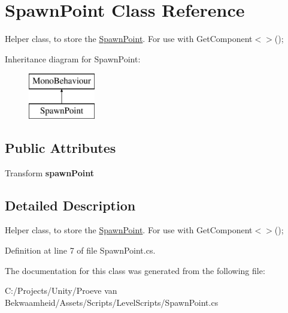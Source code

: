 \hypertarget{class_spawn_point}{\section{Spawn\+Point Class Reference}
\label{class_spawn_point}
}


Helper class, to store the \hyperlink{class_spawn_point}{Spawn\+Point}. For use with Get\+Component$<$$>$();  


Inheritance diagram for Spawn\+Point\+:\begin{figure}[H]
\begin{center}
\leavevmode
\includegraphics[height=2.000000cm]{class_spawn_point}
\end{center}
\end{figure}
\subsection*{Public Attributes}
\begin{DoxyCompactItemize}
\item 
\hypertarget{class_spawn_point_a1bbcf616b90a7e757535911a313fb838}{Transform {\bfseries spawn\+Point}}\label{class_spawn_point_a1bbcf616b90a7e757535911a313fb838}

\end{DoxyCompactItemize}


\subsection{Detailed Description}
Helper class, to store the \hyperlink{class_spawn_point}{Spawn\+Point}. For use with Get\+Component$<$$>$(); 



Definition at line 7 of file Spawn\+Point.\+cs.



The documentation for this class was generated from the following file\+:\begin{DoxyCompactItemize}
\item 
C\+:/\+Projects/\+Unity/\+Proeve van Bekwaamheid/\+Assets/\+Scripts/\+Level\+Scripts/Spawn\+Point.\+cs\end{DoxyCompactItemize}
